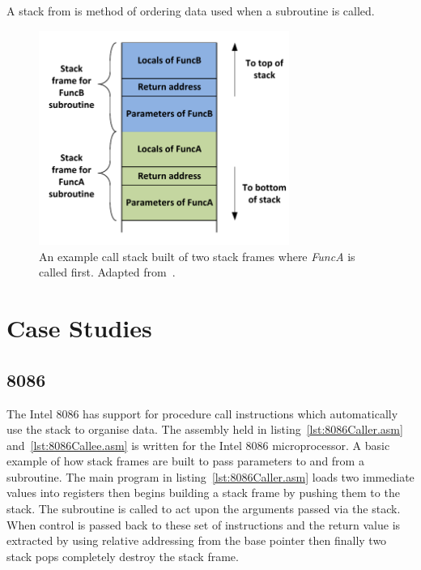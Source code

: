 \documentclass[12pt,a4paper]{article}
\begin{document}
A stack from is method of ordering data used when a subroutine is called.

\begin{figure}[htb]
   \centering
   \includegraphics[height=7cm]{Figures/CallStack.pdf}
   \caption{An example call stack built of two stack frames where \emph{FuncA} is called first. Adapted from~\cite{callWiki}.}
   \label{fig:call}
\end{figure}

\section{Case Studies}
\subsection{8086}
\label{8086}
The Intel 8086 has support for procedure call instructions which automatically use the stack to organise data.
The assembly held in listing~\ref{lst:8086Caller.asm} and~\ref{lst:8086Callee.asm} is written for the Intel 8086 microprocessor.
A basic example of how stack frames are built to pass parameters to and from a subroutine.
The main program in listing~\ref{lst:8086Caller.asm} loads two immediate values into registers then begins building a stack frame by pushing them to the stack.  
The subroutine is called to act upon the arguments passed via the stack.
When control is passed back to these set of instructions and the return value is extracted by using relative addressing from the base pointer then finally two stack pops completely destroy the stack frame.


\end{document}
